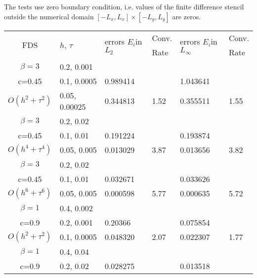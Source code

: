 \documentclass{article}
\begin{document}
The tests use zero boundary condition, i.e. values of the finite difference stencil outside the numerical domain $[-L_x, L_x] \times [-L_y, L_y]$ are zeros.

\begin{table}[ht]
\centering
\small
		\begin{tabular}{||c|l|ll|ll||}
			\hline
			\hline
      \multirow{2  }{*}{FDS}        & \multirow{2  }{*}{$h$, $\tau$}  & \multirow{2  }{*}{errors $E_i$in$L_2$}  &Conv.& \multirow{2  }{*}{errors $E_i$in$L_\infty$}  &Conv.  \\
	         &                    &                               & Rate   &                                        & Rate \\
   			\hline 
					\hline 
  $\beta=3$                &0.2, 0.001          &              &              &                     &      \\
   c=0.45                     &0.1, 0.0005          &0.989414 &            &1.043641    &       \\
     $O(h^2 + \tau^ 2)$ &0.05, 0.00025   & 0.344813 & 1.52    &0.355511    &  1.55      \\
			\hline 
  $\beta=3$               &0.2, 0.02       &              &            &                     &      \\
   c=0.45                    &0.1, 0.01      &0.191224 &            &0.193874    &       \\
     $O(h^4+ \tau^4)$ &0.05, 0.005&0.013029 & 3.87   &0.013656     &3.82       \\
			\hline 
  $\beta=3$               &0.2, 0.02       &                &            &                     &      \\
     c=0.45                 &0.1, 0.01        &0.032671 &            &  0.033626    &       \\
     $O(h^6+ \tau^6)$ &0.05, 0.005 &0.000598 &5.77     & 0.000635    & 5.72       \\
	   \hline
			\hline 
       $\beta=1$       &0.4, 0.002        &             &            &           &   \\
                  c=0.9    &0.2, 0.001       &  0.20366   &            &0.075854 &   \\
  $O(h^2+ \tau^2)$ &0.1, 0.0005   &0.048320   &2.07  &0.022307  & 1.77 \\
			\hline
      $\beta=1$               &0.4, 0.04    &            &               &             &    \\
       c=0.9                     &0.2, 0.02     & 0.028275   &        &  0.013518   &   \\

\end{tabular}
\end{table}
\end{document}
